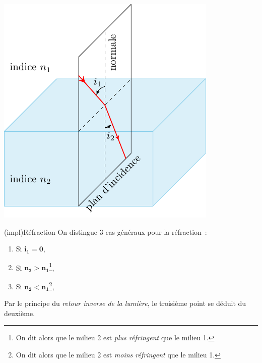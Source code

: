 \documentclass[../../main/main.tex]{subfiles}
\begin{document}
\begin{tcb*}[label=loi:snelldescartes]
	\hfill
	\begin{minipage}{0.45\linewidth}
		\begin{center}
			\includegraphics[width=\linewidth]{snell_refr_nsup}
			\label{fig:snell_refl}
		\end{center}
	\end{minipage}
\end{tcb*}

\begin{tcb*}[label=impl:refr](impl){Réfraction}
	On distingue 3 cas généraux pour la réfraction~:
	\begin{enumerate}
		\item Si $\mathbf{i_1 = 0}$,
		\item Si $\mathbf{n_2 > n_1}$\footnote{On dit alors que le milieu 2 est
			      \textit{plus réfringent} que le milieu 1.},
		\item Si $\mathbf{n_2 < n_1}$\footnote{On dit alors que le milieu 2 est
			      \textit{moins réfringent} que le milieu 1.},
	\end{enumerate}
	Par le principe du \textit{retour inverse de la lumière}, le troisième point
	se déduit du deuxième.
\end{tcb*}
\end{document}
